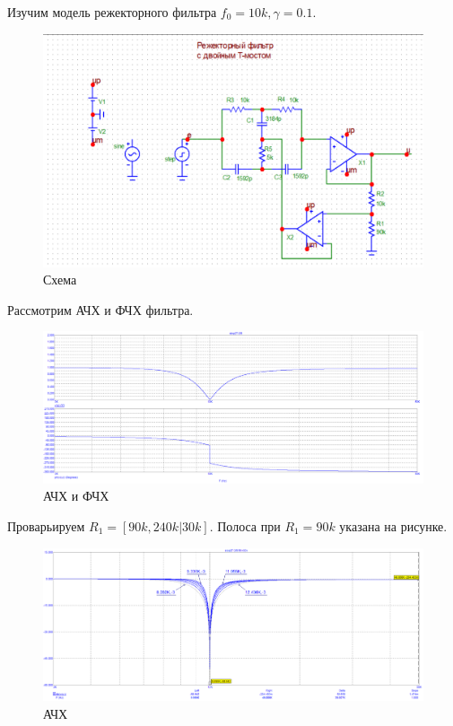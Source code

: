 \documentclass[12pt,a4paper]{article}
\begin{document}
	Изучим модель режекторного фильтра $f_0 = 10k, \gamma = 0.1$.
	\begin{figure}[H]
		\centering
		\includegraphics[width=1.0\linewidth]{res/stop2T_scheme.png}
		\caption{Схема}
		\label{scheme}
	\end{figure}
	
	Рассмотрим АЧХ и ФЧХ фильтра.
	\begin{figure}[H]
		\centering
		\includegraphics[width=1.0\linewidth]{res/stop2T.png}
		\caption{АЧХ и ФЧХ}
		\label{scheme}
	\end{figure}
	
	Проварьируем $R_1 = [90k, 240k|30k]$. Полоса при $R_1 = 90k$ указана на рисунке.
	\begin{figure}[H]
		\centering
		\includegraphics[width=1.0\linewidth]{res/stop2T_R1_90_240.png}
		\caption{АЧХ}
		\label{scheme}
	\end{figure}
	
\end{document}
